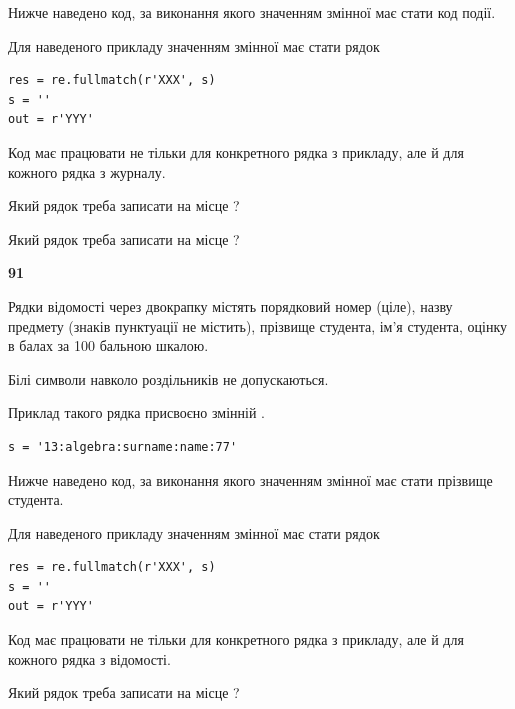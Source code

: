 Нижче наведено код, за виконання якого значенням змінної  має стати код події.

Для наведеного прикладу значенням змінної  має стати рядок 



\begin{verbatim}
res = re.fullmatch(r'XXX', s)
s = ''
out = r'YYY'
\end{verbatim}


Код має працювати не тільки для конкретного рядка з прикладу, але й для кожного рядка з журналу.




Який рядок треба записати на місце  ?\par
\vspace{5mm}


Який рядок треба записати на місце  ?\par


\newpage

{\begin {center}\textbf{ 91}\end {center}}\par
Рядки відомості через двокрапку містять порядковий номер (ціле), назву предмету (знаків пунктуації не містить), прізвище студента, ім'я студента, оцінку в балах за 100 бальною шкалою.

Білі символи навколо роздільників не допускаються.

Приклад такого рядка присвоєно змінній .



\begin{verbatim}
s = '13:algebra:surname:name:77'
\end{verbatim}


Нижче наведено код, за виконання якого значенням змінної  має стати прізвище студента.

Для наведеного прикладу значенням змінної  має стати рядок 



\begin{verbatim}
res = re.fullmatch(r'XXX', s)
s = ''
out = r'YYY'
\end{verbatim}


Код має працювати не тільки для конкретного рядка з прикладу, але й для кожного рядка з відомості.




Який рядок треба записати на місце  ?\par
\vspace{5mm}


